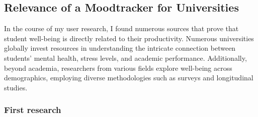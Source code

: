 \documentclass[11pt]{report}
\begin{document}
\subsection{Relevance of a Moodtracker for Universities}

In the course of my user research, I found numerous sources that prove that student well-being is directly related to their productivity. Numerous universities globally invest resources in understanding the intricate connection between students' mental health, stress levels, and academic performance. Additionally, beyond academia, researchers from various fields explore well-being across demographics, employing diverse methodologies such as surveys and longitudinal studies.

\subsubsection{First research}
\end{document}
